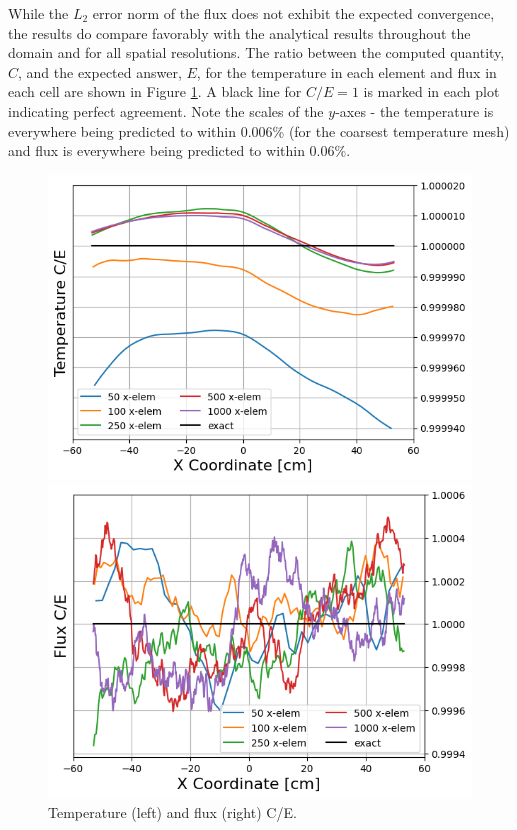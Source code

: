 \documentclass[letterpaper]{mc2023}
\begin{document}
While the $L_2$ error norm of the flux does not exhibit the expected convergence, the results do compare favorably with the analytical results
throughout the domain and for all spatial resolutions. The ratio between the computed quantity, $C$, and the expected answer, $E$, for the
temperature in each element and flux in each cell are shown in Figure \ref{fig:ce}. A black line for $C/E = 1$ is marked in each plot indicating
perfect agreement. Note the scales of the $y$-axes - the temperature is everywhere being predicted to within 0.006\% (for the coarsest temperature
mesh) and flux is everywhere being predicted to within 0.06\%.
\begin{figure}[H]
    \centering
    \begin{minipage}[b]{0.485\linewidth}
        \includegraphics[width=\linewidth]{figures/temp_num_to_analy_ratios.png}
    \end{minipage}
    \begin{minipage}[b]{0.485\linewidth}
        \includegraphics[width=\linewidth]{figures/flux_num_to_analy_ratios.png}
    \end{minipage}
    \caption{Temperature (left) and flux (right) C/E.}
    \label{fig:ce}
\end{figure}
\end{document}
